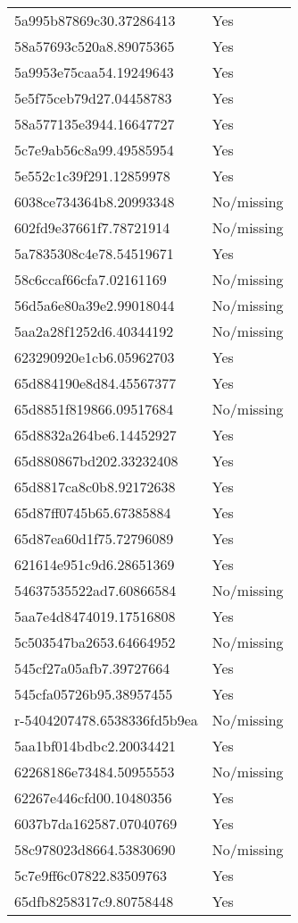 \begin{tabular}{ll}
5a995b87869c30.37286413 & Yes \\
58a57693c520a8.89075365 & Yes \\
5a9953e75caa54.19249643 & Yes \\
5e5f75ceb79d27.04458783 & Yes \\
58a577135e3944.16647727 & Yes \\
5c7e9ab56c8a99.49585954 & Yes \\
5e552c1c39f291.12859978 & Yes \\
6038ce734364b8.20993348 & No/missing \\
602fd9e37661f7.78721914 & No/missing \\
5a7835308c4e78.54519671 & Yes \\
58c6ccaf66cfa7.02161169 & No/missing \\
56d5a6e80a39e2.99018044 & No/missing \\
5aa2a28f1252d6.40344192 & No/missing \\
623290920e1cb6.05962703 & Yes \\
65d884190e8d84.45567377 & Yes \\
65d8851f819866.09517684 & No/missing \\
65d8832a264be6.14452927 & Yes \\
65d880867bd202.33232408 & Yes \\
65d8817ca8c0b8.92172638 & Yes \\
65d87ff0745b65.67385884 & Yes \\
65d87ea60d1f75.72796089 & Yes \\
621614e951c9d6.28651369 & Yes \\
54637535522ad7.60866584 & No/missing \\
5aa7e4d8474019.17516808 & Yes \\
5c503547ba2653.64664952 & No/missing \\
545cf27a05afb7.39727664 & Yes \\
545cfa05726b95.38957455 & Yes \\
r-5404207478.6538336fd5b9ea & No/missing \\
5aa1bf014bdbc2.20034421 & Yes \\
62268186e73484.50955553 & No/missing \\
62267e446cfd00.10480356 & Yes \\
6037b7da162587.07040769 & Yes \\
58c978023d8664.53830690 & No/missing \\
5c7e9ff6c07822.83509763 & Yes \\
65dfb8258317c9.80758448 & Yes \\

\end{tabular}
